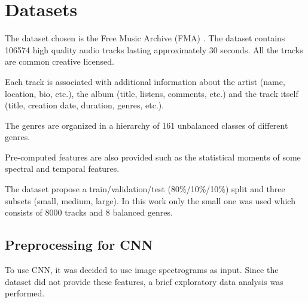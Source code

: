 \section{Datasets}

The dataset chosen is the Free Music Archive (FMA) \cite{fma_dataset}.
The dataset contains 106574 high quality audio tracks lasting approximately 30 seconds. All the tracks are common creative licensed.

Each track is associated with additional information about the artist (name, location, bio, etc.), the album (title, listens, comments, etc.) and the track itself (title, creation date, duration, genres, etc.).

The genres are organized in a hierarchy of 161 unbalanced classes of different genres.

Pre-computed features are also provided such as the statistical moments of some spectral and temporal features.

The dataset propose a train/validation/test (80\%/10\%/10\%) split and three subsets (small, medium, large).
In this work only the small one was used which consists of 8000 tracks and 8 balanced genres.

\subsection{Preprocessing for CNN}
To use CNN, it was decided to use image spectrograms as input.
Since the dataset did not provide these features, a brief exploratory data analysis was performed.

